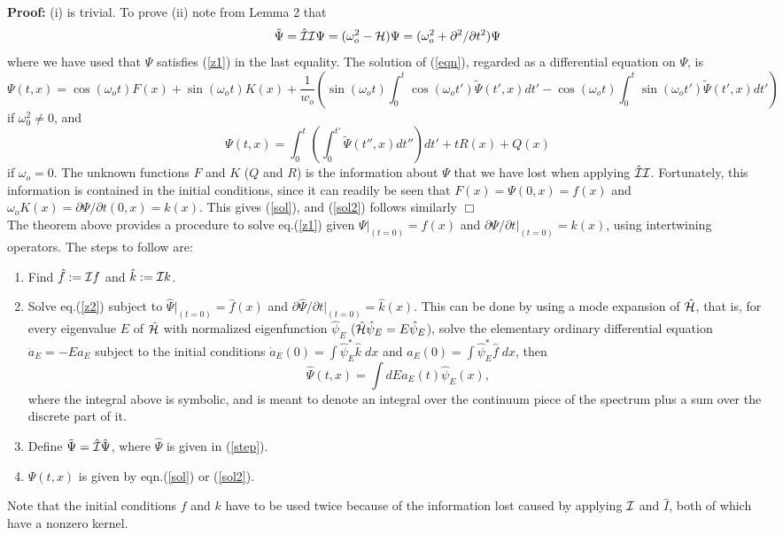 \documentclass[aps,floats,showpacs,amssymb,tightenlines]{revtex4}
\def\w{\omega}
\def\p{\partial}
\def\I{{\cal I}}
\begin{document}
{\bf Proof:} (i) is trivial. To prove (ii) note from Lemma 2 that
\begin{equation} \label{eqn}
\tilde \Psi =  \hat \I \I \Psi =  (\w_o^2 - {\cal H}) \Psi = (\w_o^2 + \p^2  / \p t^2) \Psi
\end{equation}
where we have used that $\Psi$ satisfies  (\ref{z1}) in the last equality.
 The solution of (\ref{eqn}), regarded as a  differential equation on $\Psi$, is
\begin{equation} \label{sola}
\Psi(t,x) =  \cos (\w_o t) F(x) + \sin (\w_o t) K(x) + \frac{1}{w_o} \left(
\sin (\w_o t) \int_0^t \cos (\w_o t') \tilde \Psi(t',x) dt' -\cos (\w_o t) \int_0^t \sin (\w_o t') \tilde \Psi(t',x) dt' \right)
\end{equation}
if $\w_0^2 \neq 0$, and
\begin{equation}  \label{sol2a}
\Psi(t,x) = \int_0^t \left( \int_0^{t'} \tilde \Psi(t'',x) dt'' \right) dt' + t R(x) + Q(x)
\end{equation}
if $\w_o =0$. The unknown functions $F$ and $K$ ($Q$ and $R$) is the information about $\Psi$ that we have lost
when applying $\hat \I \I$. Fortunately, this information  is contained in the
initial conditions, since it can readily be seen that $F(x) = \Psi(0,x)= f(x) $ and $\w_o K(x)=\p \Psi / \p t (0,x) = k(x)$.
This gives (\ref{sol}), and (\ref{sol2}) follows similarly $\Box$\\

The theorem above provides a procedure  to solve eq.(\ref{z1}) given  $\Psi|_{(t=0)}=f(x)$ and $\p \Psi / \p t |_{(t=0)}=
k(x)$, using intertwining operators. The steps to follow  are:
\begin{enumerate}
\item  Find $\hat f := \I f$ and $\hat k := \I k$.
\item  Solve eq.(\ref{z2}) subject to $\hat \Psi |_{(t=0)} = \hat f(x)$ and $ \p \hat \Psi/ \p t |_{(t=0)} = \hat k (x)$.
This can be done by
using a mode expansion of $\hat {\cal H}$,
that is, for every eigenvalue $E$ of $\hat {\cal H}$ with normalized eigenfunction $\hat \psi_E$ ($\hat {\cal H} \hat \psi_E
 = E \hat \psi_E$),
solve the elementary ordinary differential equation
$\ddot a_E = -E a_E $ subject to the initial conditions $\dot a_E(0) = \int \hat \psi_E ^*   \hat k
   \; dx $ and $a_E(0) = \int \hat \psi_E ^* \hat f  \; dx$, then
   \begin{equation} \label{step}
 \hat \Psi(t,x) = \int dE a_E(t) \hat \psi_E(x) ,
 \end{equation}
where the integral above is symbolic, and is meant to denote an integral over the continuum piece
of the spectrum plus a sum over the discrete part of it.
\item Define $\tilde \Psi = \hat \I \hat \Psi$, where $\hat \Psi$ is given in (\ref{step}).
\item $\Psi(t,x)$ is given by eqn.(\ref{sol}) or (\ref{sol2}).
\end{enumerate}
Note that the initial conditions $f$ and $k$ have to be used twice because of the information
lost caused by applying $\I$ and $\hat I$, both of which have a nonzero kernel.
\end{document}
